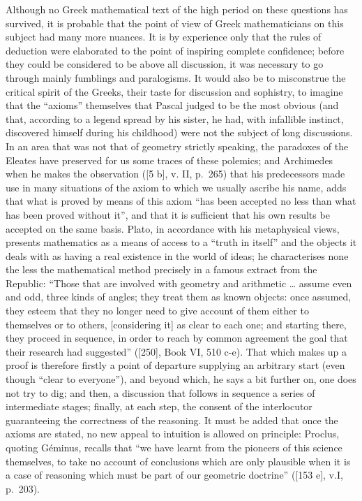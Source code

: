 Although no Greek mathematical text of the high period on these questions has survived, it is probable that the point of view of Greek mathematicians on this subject had many more nuances. It is by experience only that the rules of deduction were elaborated to the point of inspiring complete confidence; before they could be considered to be above all discussion, it was necessary to go through mainly fumblings and paralogisms. It would also be to misconstrue the critical spirit of the Greeks, their taste for discussion and sophistry, to imagine that the ``axioms'' themselves that Pascal judged to be the most obvious (and that, according to a legend spread by his sister, he had, with infallible instinct, discovered himself during his childhood) were not the subject of long discussions. In an area that was not that of geometry strictly speaking, the paradoxes of the Eleates have preserved for us some traces of these polemics; and Archimedes when he makes the observation ({[}5 b{]}, v. II, p.~265) that his predecessors made use in many situations of the axiom to which we usually ascribe his name, adds that what is proved by means of this axiom ``has been accepted no less than what has been proved without it'', and that it is sufficient that his own results be accepted on the same basis. Plato, in accordance with his metaphysical views, presents mathematics as a means of access to a ``truth in itself'' and the objects it deals with as having a real existence in the world of ideas; he characterises none the less the mathematical method precisely in a famous extract from the Republic: ``Those that are involved with geometry and arithmetic \ldots{} assume even and odd, three kinds of angles; they treat them as known objects: once assumed, they esteem that they no longer need to give account of them either to themselves or to others, {[}considering it{]} as clear to each one; and starting there, they proceed in sequence, in order to reach by common agreement the goal that their research had suggested'' ({[}250{]}, Book VI, 510 c-e). That which makes up a proof is therefore firstly a point of departure supplying an arbitrary start (even though ``clear to everyone''), and beyond which, he says a bit further on, one does not try to dig; and then, a discussion that follows in sequence a series of intermediate stages; finally, at each step, the consent of the interlocutor guaranteeing the correctness of the reasoning. It must be added that once the axioms are stated, no new appeal to intuition is allowed on principle: Proclus, quoting Géminus, recalls that ``we have learnt from the pioneers of this science themselves, to take no account of conclusions which are only plausible when it is a case of reasoning which must be part of our geometric doctrine'' ({[}153 e{]}, v.I, p.~203).


